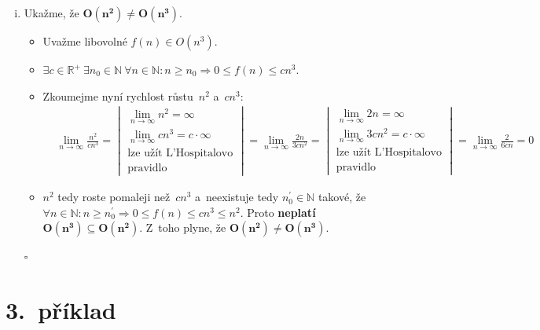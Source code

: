 \documentclass[a4paper, 11pt, fleqn]{scrartcl}
\newcommand*{\QEDB}{\hfill\ensuremath{\square}}
\begin{document}
\begin{enumerate}[(i)]
		\item
			Ukažme, že $ \boldsymbol{O(n^2) \neq O(n^3)} $.

			\begin{itemize}
				\item
					Uvažme libovolné $ f(n) \in O(n^3) $.

				\item
					$ \exists c \in \mathbb{R}^+\ \exists n_0 \in
					\mathbb{N}\ \forall n \in \mathbb{N} : n \geq n_0
					\Rightarrow 0 \leq f(n) \leq c n^3 $.

				\item
					Zkoumejme nyní rychlost růstu~$ n^2 $ a~$ c n^3 $:
					\begin{align*}
						& \lim_{n\to\infty} \frac{n^2}{c n^3} =
						\begin{vmatrix}
							\lim\limits_{n\to\infty} n^2 = \infty \\
							\lim\limits_{n\to\infty} c n^3 = c \cdot \infty \\
							\text{lze užít L'Hospitalovo} \\ \text{pravidlo}
						\end{vmatrix} =
						\lim_{n\to\infty} \frac{2 n}{3 c n^2} =
						\begin{vmatrix}
							\lim\limits_{n\to\infty} 2 n = \infty \\
							\lim\limits_{n\to\infty} 3 c n^2 = c \cdot \infty \\
							\text{lze užít L'Hospitalovo} \\ \text{pravidlo}
						\end{vmatrix} =
						\lim_{n\to\infty} \frac{2}{6 c n} = 0
					\end{align*}

				\item
					$ n^2 $ tedy roste pomaleji než~$ c n^3 $ a~neexistuje
					tedy $ n_0^\prime \in \mathbb{N} $ takové, že $ \forall n
					\in \mathbb{N} : n \geq n_0^\prime \Rightarrow 0 \leq f(n)
					\leq c n^3 \leq n^2 $. Proto \textbf{neplatí} $ \boldsymbol{
					O(n^3) \subseteq O(n^2)} $. Z~toho plyne, že $ \boldsymbol{
					O(n^2) \neq O(n^3)} $.
			\end{itemize}

			\QEDB
	\end{enumerate}


	\section*{3.~příklad}
\end{document}
